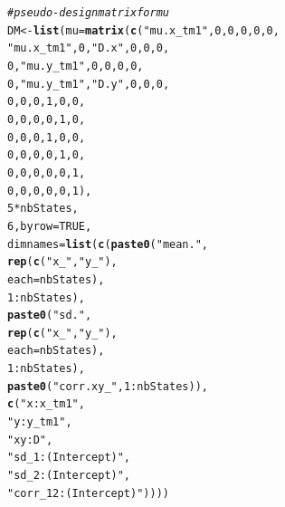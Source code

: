 \documentclass[12pt]{article}\usepackage[]{graphicx}\usepackage[]{xcolor}
\makeatletter
\newcommand{\hlnum}[1]{\textcolor[rgb]{0.686,0.059,0.569}{#1}}%
\newcommand{\hlsng}[1]{\textcolor[rgb]{0.192,0.494,0.8}{#1}}%
\newcommand{\hlcom}[1]{\textcolor[rgb]{0.678,0.584,0.686}{\textit{#1}}}%
\newcommand{\hlopt}[1]{\textcolor[rgb]{0,0,0}{#1}}%
\newcommand{\hldef}[1]{\textcolor[rgb]{0.345,0.345,0.345}{#1}}%
\newcommand{\hlkwb}[1]{\textcolor[rgb]{0.69,0.353,0.396}{#1}}%
\newcommand{\hlkwc}[1]{\textcolor[rgb]{0.333,0.667,0.333}{#1}}%
\newcommand{\hlkwd}[1]{\textcolor[rgb]{0.737,0.353,0.396}{\textbf{#1}}}%
\newenvironment{kframe}{%
 \def\at@end@of@kframe{}%
 \ifinner\ifhmode%
  \def\at@end@of@kframe{\end{minipage}}%
  \begin{minipage}{\columnwidth}%
 \fi\fi%
 \def\FrameCommand##1{\hskip\@totalleftmargin \hskip-\fboxsep
 \colorbox{shadecolor}{##1}\hskip-\fboxsep
     \hskip-\linewidth \hskip-\@totalleftmargin \hskip\columnwidth}%
 \MakeFramed {\advance\hsize-\width
   \@totalleftmargin\z@ \linewidth\hsize
   \@setminipage}}%
 {\par\unskip\endMakeFramed%
 \at@end@of@kframe}
\newenvironment{knitrout}{}{} %
\makeatother
\begin{document}
\begin{knitrout}
\begin{kframe}
\begin{alltt}
\hlcom{# pseudo-design matrix for mu}
\hldef{DM} \hlkwb{<-} \hlkwd{list}\hldef{(}\hlkwc{mu}\hldef{=}\hlkwd{matrix}\hldef{(}\hlkwd{c}\hldef{(}\hlsng{"mu.x_tm1"}\hldef{,}         \hlnum{0}\hldef{,}    \hlnum{0}\hldef{,}\hlnum{0}\hldef{,}\hlnum{0}\hldef{,}\hlnum{0}\hldef{,}
                       \hlsng{"mu.x_tm1"}\hldef{,}         \hlnum{0}\hldef{,}\hlsng{"D.x"}\hldef{,}\hlnum{0}\hldef{,}\hlnum{0}\hldef{,}\hlnum{0}\hldef{,}
                                \hlnum{0}\hldef{,}\hlsng{"mu.y_tm1"}\hldef{,}    \hlnum{0}\hldef{,}\hlnum{0}\hldef{,}\hlnum{0}\hldef{,}\hlnum{0}\hldef{,}
                                \hlnum{0}\hldef{,}\hlsng{"mu.y_tm1"}\hldef{,}\hlsng{"D.y"}\hldef{,}\hlnum{0}\hldef{,}\hlnum{0}\hldef{,}\hlnum{0}\hldef{,}
                                \hlnum{0}\hldef{,}         \hlnum{0}\hldef{,}    \hlnum{0}\hldef{,}\hlnum{1}\hldef{,}\hlnum{0}\hldef{,}\hlnum{0}\hldef{,}
                                \hlnum{0}\hldef{,}         \hlnum{0}\hldef{,}    \hlnum{0}\hldef{,}\hlnum{0}\hldef{,}\hlnum{1}\hldef{,}\hlnum{0}\hldef{,}
                                \hlnum{0}\hldef{,}         \hlnum{0}\hldef{,}    \hlnum{0}\hldef{,}\hlnum{1}\hldef{,}\hlnum{0}\hldef{,}\hlnum{0}\hldef{,}
                                \hlnum{0}\hldef{,}         \hlnum{0}\hldef{,}    \hlnum{0}\hldef{,}\hlnum{0}\hldef{,}\hlnum{1}\hldef{,}\hlnum{0}\hldef{,}
                                \hlnum{0}\hldef{,}         \hlnum{0}\hldef{,}    \hlnum{0}\hldef{,}\hlnum{0}\hldef{,}\hlnum{0}\hldef{,}\hlnum{1}\hldef{,}
                                \hlnum{0}\hldef{,}         \hlnum{0}\hldef{,}    \hlnum{0}\hldef{,}\hlnum{0}\hldef{,}\hlnum{0}\hldef{,}\hlnum{1}\hldef{),}
                     \hlnum{5}\hlopt{*}\hldef{nbStates,}
                     \hlnum{6}\hldef{,}\hlkwc{byrow}\hldef{=}\hlnum{TRUE}\hldef{,}
                     \hlkwc{dimnames}\hldef{=}\hlkwd{list}\hldef{(}\hlkwd{c}\hldef{(}\hlkwd{paste0}\hldef{(}\hlsng{"mean."}\hldef{,}
                                            \hlkwd{rep}\hldef{(}\hlkwd{c}\hldef{(}\hlsng{"x_"}\hldef{,}\hlsng{"y_"}\hldef{),}
                                                \hlkwc{each}\hldef{=nbStates),}
                                            \hlnum{1}\hlopt{:}\hldef{nbStates),}
                                     \hlkwd{paste0}\hldef{(}\hlsng{"sd."}\hldef{,}
                                            \hlkwd{rep}\hldef{(}\hlkwd{c}\hldef{(}\hlsng{"x_"}\hldef{,}\hlsng{"y_"}\hldef{),}
                                                \hlkwc{each}\hldef{=nbStates),}
                                            \hlnum{1}\hlopt{:}\hldef{nbStates),}
                                     \hlkwd{paste0}\hldef{(}\hlsng{"corr.xy_"}\hldef{,}\hlnum{1}\hlopt{:}\hldef{nbStates)),}
                                   \hlkwd{c}\hldef{(}\hlsng{"x:x_tm1"}\hldef{,}
                                     \hlsng{"y:y_tm1"}\hldef{,}
                                     \hlsng{"xy:D"}\hldef{,}
                                     \hlsng{"sd_1:(Intercept)"}\hldef{,}
                                     \hlsng{"sd_2:(Intercept)"}\hldef{,}
                                     \hlsng{"corr_12:(Intercept)"}\hldef{))))}


\end{alltt}
\end{kframe}
\end{knitrout}
\end{document}
